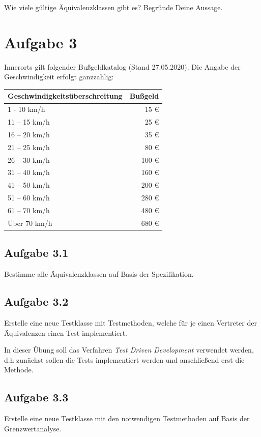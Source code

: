 Wie viele gültige Äquivalenzklassen gibt es? Begründe Deine Aussage.

\newpage
\section*{Aufgabe 3}
Innerorts gilt folgender Bußgeldkatalog (Stand 27.05.2020). Die Angabe der Geschwindigkeit erfolgt ganzzahlig:

\vspace{.3cm}

\begin{tabular}{|l|r|}
\hline
\textbf{Geschwindigkeitsüberschreitung} & \textbf{Bußgeld} \\ \hline\hline
1 - 10 km/h                      & 15 €    \\ \hline
11 – 15 km/h 	                 & 25 €	   \\ \hline
16 – 20 km/h 	                 & 35 €	   \\ \hline
21 – 25 km/h 	                 & 80 €	   \\ \hline
26 – 30 km/h 	                 & 100 €   \\ \hline
31 – 40 km/h 	                 & 160 €   \\ \hline
41 – 50 km/h 	                 & 200 €   \\ \hline
51 – 60 km/h 	                 & 280 €   \\ \hline
61 – 70 km/h 	                 & 480 €   \\ \hline
Über 70 km/h 	                 & 680 €   \\ \hline
\end{tabular}

\subsection*{Aufgabe 3.1}
Bestimme alle Äquivalenzklassen auf Basis der Spezifikation.

\subsection*{Aufgabe 3.2}
Erstelle eine neue Testklasse mit Testmethoden, welche für je einen Vertreter der Äquivalenzen einen Test implementiert.

In dieser Übung soll das Verfahren \textit{Test Driven Development} verwendet werden, d.h zunächst sollen die Tests implementiert werden und anschließend erst die Methode.

\subsection*{Aufgabe 3.3}
Erstelle eine neue Testklasse mit den notwendigen Testmethoden auf Basis der Grenzwertanalyse.

